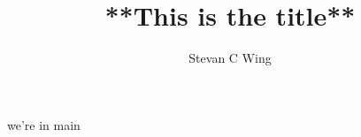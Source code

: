 \documentclass[oneside,article]{memoir}
\def\mytitle{**This is the title**}
\def\myauthor{Stevan C Wing}
\def\bibliocommand{}
\def\bibliostyle{nature}
\begin{document}
\title{\mytitle}
\author{\myauthor}

\ifx\mydate\undefined
\else
	\date{\mydate}
\fi

\mainmatter
\maketitle

\setlength{\parindent}{0pt}

\ifx\mycopyright\undefined
\else
	\textcopyright{} \mycopyright
\fi

\setlength{\parindent}{1em}




\if@mainmatter
	we're in main
	\backmatter
\fi


\ifx\bibliocommand\undefined
\else
	
	\bibliocommand
\fi

\printglossaries

\printindex
\end{document}
